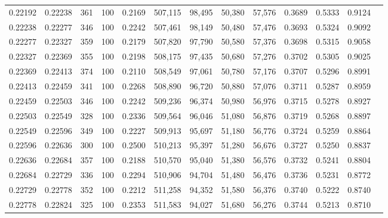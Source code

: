 \begin{tabular}{rrrrrrrrrrrrr}
0.22192 & 0.22238 &   361 & 100 &                                     0.2169 & 507,115 &  98,495 &  50,380 &  57,576 & 0.3689 & 0.5333 & 0.9124 \\
0.22238 & 0.22277 &   346 & 100 &                                     0.2242 & 507,461 &  98,149 &  50,480 &  57,476 & 0.3693 & 0.5324 & 0.9092 \\
0.22277 & 0.22327 &   359 & 100 &                                     0.2179 & 507,820 &  97,790 &  50,580 &  57,376 & 0.3698 & 0.5315 & 0.9058 \\
0.22327 & 0.22369 &   355 & 100 &                                     0.2198 & 508,175 &  97,435 &  50,680 &  57,276 & 0.3702 & 0.5305 & 0.9025 \\
0.22369 & 0.22413 &   374 & 100 &                                     0.2110 & 508,549 &  97,061 &  50,780 &  57,176 & 0.3707 & 0.5296 & 0.8991 \\
0.22413 & 0.22459 &   341 & 100 &                                     0.2268 & 508,890 &  96,720 &  50,880 &  57,076 & 0.3711 & 0.5287 & 0.8959 \\
0.22459 & 0.22503 &   346 & 100 &                                     0.2242 & 509,236 &  96,374 &  50,980 &  56,976 & 0.3715 & 0.5278 & 0.8927 \\
0.22503 & 0.22549 &   328 & 100 &                                     0.2336 & 509,564 &  96,046 &  51,080 &  56,876 & 0.3719 & 0.5268 & 0.8897 \\
0.22549 & 0.22596 &   349 & 100 &                                     0.2227 & 509,913 &  95,697 &  51,180 &  56,776 & 0.3724 & 0.5259 & 0.8864 \\
0.22596 & 0.22636 &   300 & 100 &                                     0.2500 & 510,213 &  95,397 &  51,280 &  56,676 & 0.3727 & 0.5250 & 0.8837 \\
0.22636 & 0.22684 &   357 & 100 &                                     0.2188 & 510,570 &  95,040 &  51,380 &  56,576 & 0.3732 & 0.5241 & 0.8804 \\
0.22684 & 0.22729 &   336 & 100 &                                     0.2294 & 510,906 &  94,704 &  51,480 &  56,476 & 0.3736 & 0.5231 & 0.8772 \\
0.22729 & 0.22778 &   352 & 100 &                                     0.2212 & 511,258 &  94,352 &  51,580 &  56,376 & 0.3740 & 0.5222 & 0.8740 \\
0.22778 & 0.22824 &   325 & 100 &                                     0.2353 & 511,583 &  94,027 &  51,680 &  56,276 & 0.3744 & 0.5213 & 0.8710 \\

\end{tabular}

